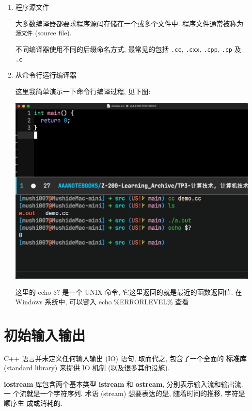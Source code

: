 \documentclass[lang=cn]{elegantbook}
\begin{document}
\begin{enumerate}
\item 程序源文件
\label{sec:orga07500f}

大多数编译器都要求程序源码存储在一个或多个文件中. 程序文件通常被称为 \texttt{源文件}
(source file).

不同编译器使用不同的后缀命名方式, 最常见的包括 \texttt{.cc}, \texttt{.cxx}, \texttt{.cpp}, \texttt{.cp} 及 \texttt{.c}

\item 从命令行运行编译器
\label{sec:orga761210}

这里我简单演示一下命令行编译过程, 见下图:

\begin{center}
\includegraphics[width=1.0\textwidth]{img/democc_演示.png}
\end{center}

\begin{note}
这里的 echo \$? 是一个 UNIX 命令, 它这里返回的就是最近的函数返回值. 在 Windows 系统中, 可以键入 echo \%ERRORLEVEL\% 查看
\end{note}
\end{enumerate}

\section{初始输入输出}
\label{sec:orgfc7f62f}

C++ 语言并未定义任何输入输出 (IO) 语句, 取而代之, 包含了一个全面的 \textbf{标准库}
(standard library) 来提供 IO 机制 (以及很多其他设施).

\textbf{iostream} 库包含两个基本类型 \textbf{istream} 和 \textbf{ostream}, 分别表示输入流和输出流. 一
个流就是一个字符序列. 术语 (stream) 想要表达的是, 随着时间的推移, 字符是顺序生
成或消耗的.
\end{document}
